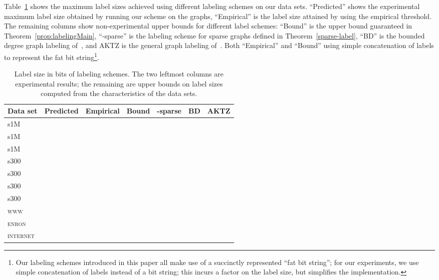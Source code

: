 \documentclass{article}
\theoremstyle{remark}
\begin{document}
Table~\ref{t:labelsizes}  shows
 the maximum label sizes achieved using different labeling schemes on our data sets. ``Predicted'' shows the experimental maximum label size obtained by running our scheme on the graphs, ``Empirical'' is the label size attained by using the empirical threshold. The remaining columns show non-experimental upper bounds for different label schemes: ``Bound'' is the upper bound guaranteed in Theorem~\ref{prop:labelingMain}, ``-sparse'' is  the labeling scheme for sparse graphs defined in Theorem~\ref{sparse-label}, ``BD'' is the  bounded degree graph  labeling of~\cite{adjiashvili2014labeling}, and AKTZ is the  general graph  labeling of~\cite{alstrup2014adjacency}.
Both ``Empirical'' and  ``Bound'' using simple concatenation of labels to represent the fat bit string\footnote{Our labeling schemes introduced in this paper all make use of a succinctly represented ``fat bit string''; for our experiments, we use simple concatenation of labels instead of a bit string; this incurs a  factor on the label size, but simplifies the implementation.}.
 

\begin{table}[!ht]
\centering
\small
\begin{tabular}{l|llllll}
Data set             &Predicted & Empirical & Bound     &  -sparse & BD \cite{adjiashvili2014labeling} & AKTZ \cite{alstrup2014adjacency} \\\hline
s1M  &    &    &  &     & &\\\hline
s1M  &    &    &  &     & &\\\hline
s1M  &    &    &  &     &  &\\\hline
s300 &    &    &  &     & &\\\hline
s300 &    &    &  &     &  &\\\hline
s300 &    &    &   &     &  &\\\hline
s300 &    &    &   &     &  &\\\hline
\textsc{www}        &    &    &  &     & & \\\hline
\textsc{enron}      &    &    &  &      &  &\\\hline
\textsc{internet}   &    &    &   &      &  &\\\hline 
\end{tabular}
\caption{Label size in bits of labeling schemes. The two leftmost columns are experimental results; the remaining are upper bounds on label sizes computed from the characteristics of the data sets.}
\label{t:labelsizes}
\end{table}
\end{document}
